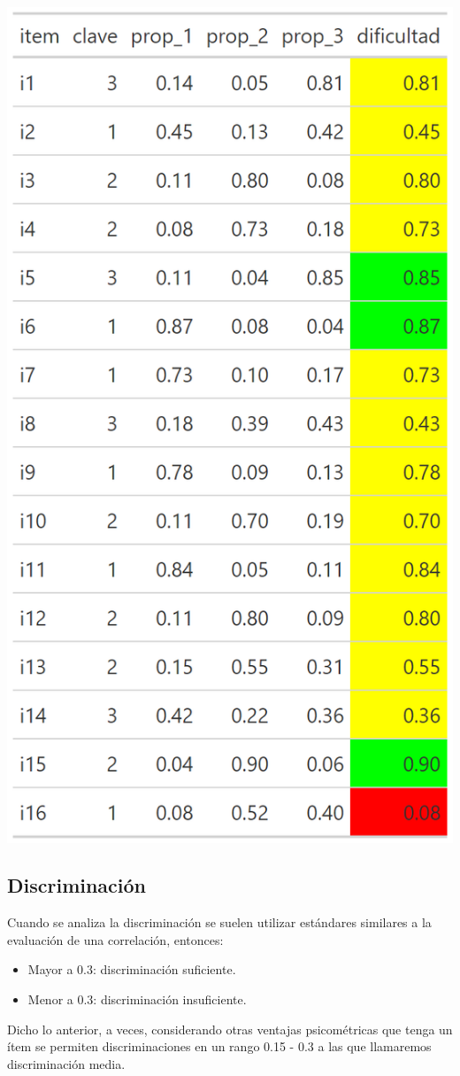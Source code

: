 \documentclass[
  letterpaper,
  DIV=11,
  numbers=noendperiod]{scrreprt}
\begin{document}
\begin{center}
\includegraphics[width=0.6\linewidth,height=\textheight,keepaspectratio]{images/teoria_clasica_diff_all.png}
\end{center}

\subsection{\texorpdfstring{\textbf{Discriminación}}{Discriminación}}\label{discriminaciuxf3n-1}

\begin{tcolorbox}[enhanced jigsaw, opacityback=0, bottomrule=.15mm, rightrule=.15mm, leftrule=.75mm, coltitle=black, colbacktitle=quarto-callout-tip-color!10!white, left=2mm, title=\textcolor{quarto-callout-tip-color}{\faLightbulb}\hspace{0.5em}{Tip}, bottomtitle=1mm, toprule=.15mm, colframe=quarto-callout-tip-color-frame, breakable, titlerule=0mm, toptitle=1mm, arc=.35mm, colback=white, opacitybacktitle=0.6]

Cuando se analiza la discriminación se suelen utilizar estándares
similares a la evaluación de una correlación, entonces:

\begin{itemize}
\item
  Mayor a 0.3: discriminación suficiente.
\item
  Menor a 0.3: discriminación insuficiente.
\end{itemize}

Dicho lo anterior, a veces, considerando otras ventajas psicométricas
que tenga un ítem se permiten discriminaciones en un rango 0.15 - 0.3 a
las que llamaremos discriminación media.

\end{tcolorbox}
\end{document}
